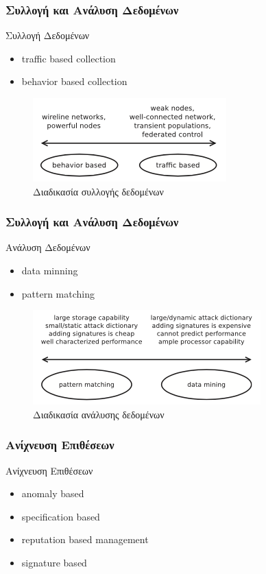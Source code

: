 \documentclass[handouts,hyperref={pdfpagelabels=false}]{beamer}
\begin{document}
\begin{frame}
\frametitle{\foreignlanguage{greek}{Συλλογή και Ανάλυση Δεδομένων}}
\begin{block}{Συλλογή Δεδομένων}
\begin{itemize}
    \item \textlatin{traffic based collection}
    \item \textlatin{behavior based collection}
\end{itemize}
\end{block}
\begin{figure}
\includegraphics[scale=0.6]{coll-appr}
\caption{Διαδικασία συλλογής δεδομένων}
\end{figure}
\end{frame}

\begin{frame}
\frametitle{\foreignlanguage{greek}{Συλλογή και Ανάλυση Δεδομένων}}
\begin{block}{Ανάλυση Δεδομένων}
\begin{itemize}
    \item \textlatin{data minning}
    \item \textlatin{pattern matching}
\end{itemize}
\end{block}
\begin{figure}
\includegraphics[scale=0.6]{anal-appr}
\caption{Διαδικασία ανάλυσης δεδομένων}
\end{figure}
\end{frame}

\begin{frame}
\frametitle{\foreignlanguage{greek}{Ανίχνευση Επιθέσεων}}
\begin{block}{Ανίχνευση Επιθέσεων}
\begin{itemize}
    \item \textlatin{anomaly based}
    \item \textlatin{specification based}
    \item \textlatin{reputation based management}
    \item \textlatin{signature based}
\end{itemize}
\end{block}
\end{frame}
\end{document}
